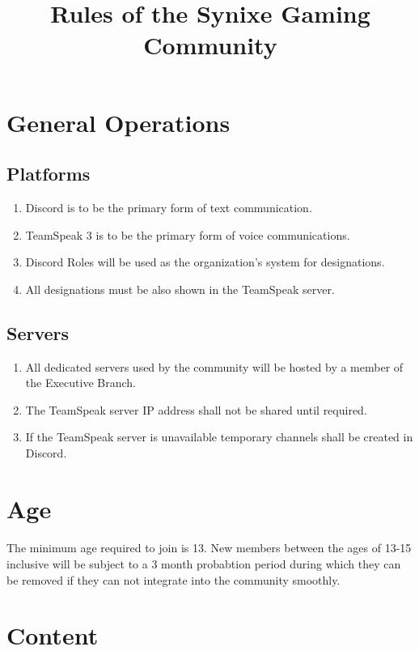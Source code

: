 \documentclass[10pt,a4paper]{article}
\title{Rules of the Synixe Gaming Community}
\begin{document}
\maketitle
\newpage

\section{General Operations}
\subsection{Platforms}
\begin{enumerate}
	\item Discord is to be the primary form of text communication.
	\item TeamSpeak 3 is to be the primary form of voice communications.
	\item Discord Roles will be used as the organization's system for designations.
	\item All designations must be also shown in the TeamSpeak server.
\end{enumerate}
\subsection{Servers}
\begin{enumerate}
	\item All dedicated servers used by the community will be hosted by a member of the Executive Branch.
	\item The TeamSpeak server IP address shall not be shared until required.
	\item If the TeamSpeak server is unavailable temporary channels shall be created in Discord.
\end{enumerate}
\section{Age}
\paragraph{}
The minimum age required to join is 13. New members between the ages of 13-15 inclusive will be subject to a 3 month probabtion period during which they can be removed if they can not integrate into the community smoothly.
\section{Content} \label{content}
\end{document}
